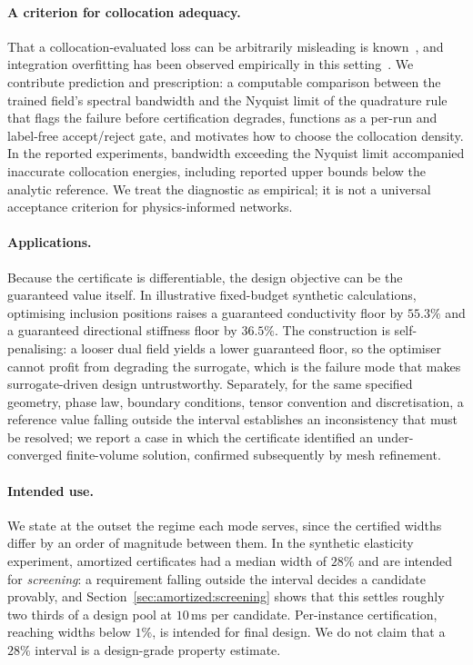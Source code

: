 \paragraph{A criterion for collocation adequacy.} That a
collocation-evaluated loss can be arbitrarily misleading is
known~\cite{Berrone2022}, and integration overfitting has been observed
empirically in this
setting~\cite{Gaynutdinova2026}. We contribute prediction and prescription:
a computable comparison between the trained field's spectral bandwidth and
the Nyquist limit of the quadrature rule that flags the failure before
certification degrades, functions as a per-run and label-free accept/reject
gate, and motivates how to choose the collocation density. In the reported
experiments, bandwidth exceeding the Nyquist limit accompanied inaccurate
collocation energies, including reported upper bounds below the analytic
reference. We treat the diagnostic as empirical; it is not a universal
acceptance criterion for physics-informed networks.

\paragraph{Applications.} Because the certificate is differentiable, the
design objective can be the guaranteed value itself. In illustrative
fixed-budget synthetic calculations, optimising inclusion positions raises a
guaranteed conductivity floor by $55.3\%$ and a guaranteed directional
stiffness floor by $36.5\%$.
The construction is self-penalising: a looser dual field yields a lower guaranteed floor, so the optimiser cannot profit from degrading the
surrogate, which is the failure mode that makes surrogate-driven design
untrustworthy. Separately, for the same specified geometry, phase law,
boundary conditions, tensor convention and discretisation, a reference value
falling outside the interval establishes an inconsistency that must be
resolved; we report a case in which the certificate identified an
under-converged finite-volume solution, confirmed subsequently by mesh
refinement.

\paragraph{Intended use.} We state at the outset the regime each mode
serves, since the certified widths differ by an order of magnitude between
them. In the synthetic elasticity experiment, amortized certificates had a
median width of $28\%$ and are intended for \emph{screening}: a requirement falling outside the interval
decides a candidate provably, and Section~\ref{sec:amortized:screening}
shows that this settles roughly two thirds of a design pool at $10$\,ms per
candidate. Per-instance certification, reaching widths below $1\%$, is
intended for final design. We do not claim that a $28\%$ interval is a
design-grade property estimate.

